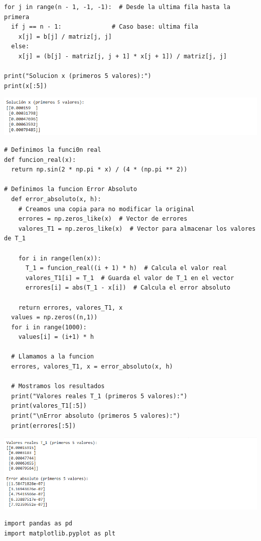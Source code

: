 \begin{homeworkProblem}
\begin{solucion}
\begin{enumerate}[a)]
\begin{lstlisting}
for j in range(n - 1, -1, -1):  # Desde la ultima fila hasta la primera
  if j == n - 1:              # Caso base: ultima fila
    x[j] = b[j] / matriz[j, j]
  else:
    x[j] = (b[j] - matriz[j, j + 1] * x[j + 1]) / matriz[j, j]
            
print("Solucion x (primeros 5 valores):")
print(x[:5])            
          \end{lstlisting}
          \begin{center}
            \includegraphics[scale=0.7]{code5.png}
          \end{center}
          \begin{lstlisting}
# Definimos la funci0n real
def funcion_real(x):
  return np.sin(2 * np.pi * x) / (4 * (np.pi ** 2))
            
# Definimos la funcion Error Absoluto
  def error_absoluto(x, h):
    # Creamos una copia para no modificar la original
    errores = np.zeros_like(x)  # Vector de errores
    valores_T1 = np.zeros_like(x)  # Vector para almacenar los valores de T_1
            
    for i in range(len(x)):
      T_1 = funcion_real((i + 1) * h)  # Calcula el valor real
      valores_T1[i] = T_1  # Guarda el valor de T_1 en el vector
      errores[i] = abs(T_1 - x[i])  # Calcula el error absoluto
            
    return errores, valores_T1, x
  values = np.zeros((n,1))
  for i in range(1000):
    values[i] = (i+1) * h

  # Llamamos a la funcion
  errores, valores_T1, x = error_absoluto(x, h)
            
  # Mostramos los resultados
  print("Valores reales T_1 (primeros 5 valores):")
  print(valores_T1[:5])
  print("\nError absoluto (primeros 5 valores):")
  print(errores[:5])        
          \end{lstlisting}      
          \begin{center}
            \includegraphics[scale=0.8]{code6.png}
          \end{center}
          \begin{lstlisting}
import pandas as pd
import matplotlib.pyplot as plt


\end{lstlisting}
\end{enumerate}
\end{solucion}
\end{homeworkProblem}
